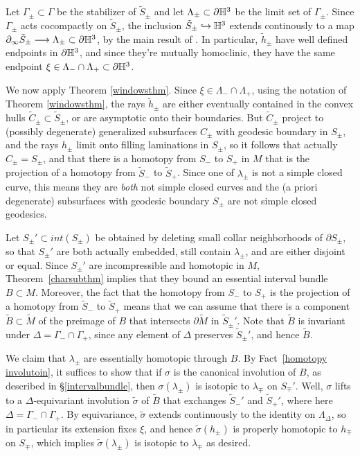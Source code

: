 \documentclass[12pt]{amsart}
\theoremstyle{definition}
\theoremstyle{remark}
\begin{document}
Let $\Gamma_\pm \subset \Gamma$ be the stabilizer of $\tilde S_\pm$ and let $\Lambda_\pm \subset \partial\mathbb H^3$ be the limit set of $\Gamma_\pm$. Since $\Gamma_\pm$ acts cocompactly on $\tilde S_\pm$, the inclusion $\tilde S_\pm \hookrightarrow \mathbb H^3$ extends continously to a map $\partial_\infty \tilde S_\pm \longrightarrow \Lambda_\pm \subset \partial \mathbb H^3$, by the main result of \cite{mj2017cannon}. In particular, $\tilde h_\pm$ have well defined endpoints in $\partial \mathbb H^3$, and since they're mutually homoclinic, they have the same endpoint $\xi \in \Lambda_- \cap \Lambda_+ \subset \partial \mathbb H^3$. 

We now apply Theorem \ref{windowsthm}. Since $\xi \in \Lambda_- \cap \Lambda_+$, using the notation of Theorem \ref{windowsthm}, the rays $\tilde h_\pm$ are either eventually contained in the convex hulls $\tilde C_\pm \subset \tilde S_\pm$, or are asymptotic onto their boundaries. But $\tilde C_\pm$ project to (possibly degenerate) generalized subsurfaces $C_\pm$ with geodesic boundary in $S_\pm$, and the rays $h_\pm$ limit onto filling laminations in $S_\pm$, so it follows that actually $C_\pm=S_\pm$, and that there is a homotopy from $S_-$ to $S_+$ in $M$ that is the projection of a homotopy from $\tilde S_-$ to $\tilde S_+$. Since one of $\lambda_\pm$ is not a simple closed curve, this means they are \emph{both} not simple closed curves and the (a priori degenerate) subsurfaces with geodesic boundary $S_\pm$ are not simple closed geodesics.

Let $S_\pm' \subset int(S_\pm)$ be obtained by deleting small collar neighborhoods of $\partial S_\pm$, so that $S_\pm'$ are both actually embedded, still contain $\lambda_\pm$, and are either disjoint or equal. Since $S_\pm'$ are incompressible and homotopic in $M$, Theorem~\ref{charsubthm} implies that they bound an essential interval bundle $B\subset M$. Moreover, the fact that the homotopy from $S_-$ to $S_+$ is the projection of a homotopy from $\tilde S_-$ to $\tilde S_+$ means that we can assume that there is a component $\tilde B \subset \tilde M$ of the preimage of $B$ that intersects $\partial \tilde M$ in $\tilde S_\pm'$. Note that $\tilde B$ is invariant under $\Delta =\Gamma_- \cap \Gamma_+$, since any element of $\Delta$ preserves $\tilde S_\pm'$, and hence $\tilde B$.


We claim that $\lambda_\pm$ are essentially homotopic through $B$. By Fact~\ref{homotopy involutoin}, it suffices to show that if $\sigma$ is the canonical involution of $B$, as described in  \S \ref{intervalbundle}, then $\sigma(\lambda_\pm) $ is isotopic to $\lambda_\mp$ on $S_\mp'$. Well, $\sigma$ lifts to a $\Delta$-equivariant involution $\tilde \sigma$ of $\tilde B$ that exchanges $\tilde S_-'$ and $\tilde S_+'$, where here $\Delta = \Gamma_-\cap \Gamma_+$. By equivariance, $\tilde \sigma$ extends continuously to the identity on $\Lambda_\Delta$, so in particular its extension fixes $\xi$, and hence $\tilde \sigma(h_\pm)$ is properly homotopic to $h_\mp$ on $S_\mp$, which implies $\tilde \sigma(\lambda_\pm)$ is isotopic to $\lambda_\mp$ as desired.
\end{document}
